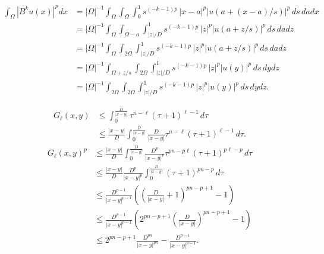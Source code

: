 \documentclass[10pt,a4paper]{article}
\begin{document}
\begin{align*}
    \int_{\Omega}
    \left| B^{k} u(x) \right|^{p}
    dx
    &
    = 
    |\Omega|^{-1}
    \int_{\Omega}
    \int_{\Omega} 
    \int_0^1
    s^{(-{k}-1)p}\, |x-a|^{p} \left| u\left( a+(x-a)/s \right) \right|^{p} \,ds\,da
    dx
    \\&
    = 
    |\Omega|^{-1}
    \int_{\Omega}
    \int_{\Omega-a} 
    \int_{|z|/D}^{1}
    s^{(-{k}-1)p}\, |z|^{p} \left| u\left( a+z/s \right) \right|^{p} \,ds\,da
    dz
    \\&
    = 
    |\Omega|^{-1}
    \int_{\Omega}
    \int_{2\Omega} 
    \int_{|z|/D}^{1}
    s^{(-{k}-1)p}\, |z|^{p} \left| u\left( a+z/s \right) \right|^{p} \,ds\,da
    dz
    \\&
    = 
    |\Omega|^{-1}
    \int_{\Omega + z/s}
    \int_{2\Omega} 
    \int_{|z|/D}^{1} %
    s^{(-{k}-1)p}\, |z|^{p} \left| u\left( y \right) \right|^{p} \,ds\,dy
    dz
    \\&
    = 
    |\Omega|^{-1}
    \int_{2\Omega}
    \int_{2\Omega} 
    \int_{|z|/D}^{1} %
    s^{(-{k}-1)p}\, |z|^{p} \left| u\left( y \right) \right|^{p} \,ds\,dy
    dz
    .
\end{align*}



\begin{align*}
    G_\ell(x,y) 
    &\leq 
    \int_{0}^{\frac{D}{|x-y|}} \tau^{n-\ell} (\tau+1)^{\ell-1} \,d\tau
    \\
    &\leq 
    \frac{|x-y|}{D}
    \int_{0}^{\frac{D}{|x-y|}} \frac{D}{|x-y|} \tau^{n-\ell} (\tau+1)^{\ell-1} \,d\tau
    .
\end{align*}
\begin{align*}
    G_\ell(x,y)^{p} 
    &\leq 
    \frac{|x-y|}{D}
    \int_{0}^{\frac{D}{|x-y|}} \frac{D^{p}}{|x-y|^{p}} \tau^{pn-p\ell} (\tau+1)^{p\ell-p} \,d\tau
    \\&\leq 
    \frac{|x-y|}{D}
    \frac{D^{p}}{|x-y|^{p}} \int_{0}^{\frac{D}{|x-y|}} (\tau+1)^{pn-p} \,d\tau
    \\&\leq 
    \frac{D^{p-1}}{|x-y|^{p-1}} \left( \left( \frac{D}{|x-y|} + 1 \right)^{pn-p+1} - 1 \right)
    \\&\leq 
    \frac{D^{p-1}}{|x-y|^{p-1}} \left( 2^{pn-p+1} \left( \frac{D}{|x-y|} \right)^{pn-p+1} - 1 \right)
    \\&\leq 
    2^{pn-p+1} \frac{D^{pn}}{|x-y|^{pn}} - \frac{D^{p-1}}{|x-y|^{p-1}}
    .
\end{align*}
\end{document}
